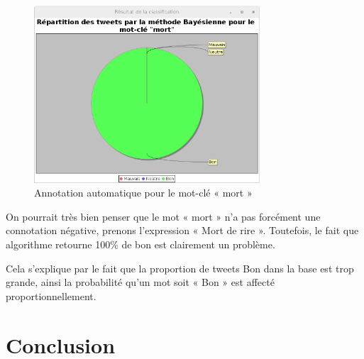 \documentclass[12pt,a4paper]{report}
\begin{document}
\begin{figure}
    \centering
    \includegraphics[width=0.75\textwidth]{img/bayes_annotation_mort_tweetsv7.eps}
    \caption{Annotation automatique pour le mot-clé « mort »}
    \label{capture_classification_mort_tweetsv7}
\end{figure}

On pourrait très bien penser que le mot « mort » n'a pas forcément une
connotation négative, prenons l'expression « Mort de rire ». Toutefois, le fait
que algorithme retourne 100\% de bon est clairement un problème.

Cela s'explique par le fait que la proportion de tweets Bon dans la base est
trop grande, ainsi la probabilité qu'un mot soit « Bon » est affecté
proportionnellement.


\chapter{Conclusion}
\end{document}
